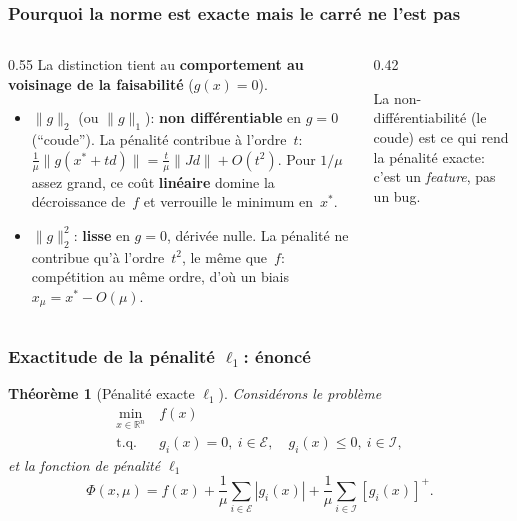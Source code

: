 \documentclass[t,usepdftitle=false,aspectratio=169]{beamer}
\newtheorem{thm}{Théorème}
\def\cE{\mathcal{E}}
\def\cI{\mathcal{I}}
\def\RR{\mathbb{R}}
\begin{document}
\begin{frame}
\frametitle{Pourquoi la norme est exacte mais le carré ne l'est pas}

\begin{columns}[T]
\begin{column}{0.55\textwidth}
La distinction tient au \textbf{comportement au voisinage de la faisabilité} ($g(x) = 0$).

\begin{itemize}
\item
$\|g\|_2$ (ou $\|g\|_1$): \textbf{non différentiable} en $g=0$ (``coude''). La pénalité contribue à l'ordre~$t$:
$\tfrac{1}{\mu}\|g(x^*\!+td)\| = \tfrac{t}{\mu}\|Jd\| + O(t^2)$.
Pour $1/\mu$ assez grand, ce coût \textbf{linéaire} domine la décroissance de~$f$ et verrouille le minimum en~$x^*$.
\item
$\|g\|_2^2$: \textbf{lisse} en $g=0$, dérivée nulle. La pénalité ne contribue qu'à l'ordre~$t^2$, le même que~$f$: compétition au même ordre, d'où un biais $x_\mu = x^* - O(\mu)$.
\end{itemize}
\end{column}
\begin{column}{0.42\textwidth}
\centering
{}

{\small La non-différentiabilité (le coude) est ce qui rend la pénalité exacte: c'est un \emph{feature}, pas un bug.}
\end{column}
\end{columns}

\end{frame}

\begin{frame}
\frametitle{Exactitude de la pénalité $\ell_1$: énoncé}

\begin{thm}[Pénalité exacte $\ell_1$]
Considérons le problème
\begin{align*}
\min_{x \in \RR^n}\ & f(x) \\
\mbox{t.q. } & g_i(x) = 0,\ i \in \cE, \quad g_i(x) \leq 0,\ i \in \cI,
\end{align*}
et la fonction de pénalité $\ell_1$
$$
\Phi(x, \mu) = f(x) + \frac{1}{\mu} \sum_{i \in \cE} | g_i(x) | + \frac{1}{\mu} \sum_{i \in \cI} [ g_i(x) ]^+.
$$
\end{thm}

\end{frame}
\end{document}
